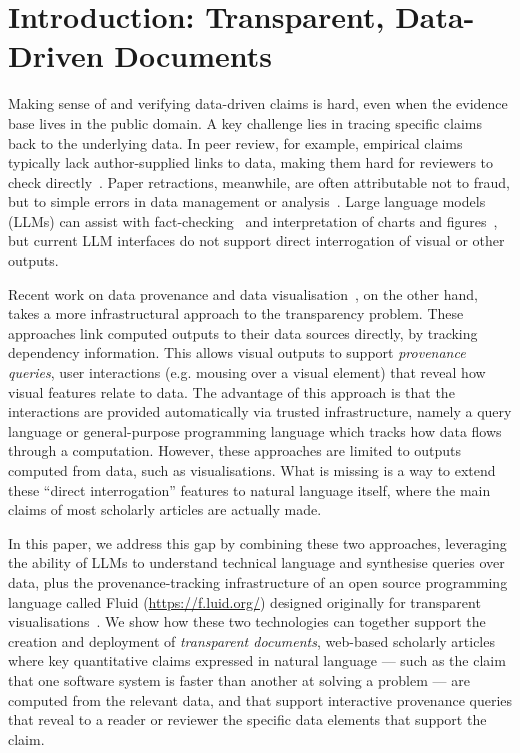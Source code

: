 \section{Introduction: Transparent, Data-Driven Documents}

Making sense of and verifying data-driven claims is hard, even when the evidence base lives in the public
domain. A key challenge lies in tracing specific claims back to the underlying data. In peer review, for
example, empirical claims typically lack author-supplied links to data, making them hard for reviewers to
check directly~\citep{weber20}. Paper retractions, meanwhile, are often attributable not to fraud, but to
simple errors in data management or analysis~\citep{hu25}. Large language models (LLMs) can assist with
fact-checking~\citep{abu-ahmad25} and interpretation of charts and figures~\citep{roberts24}, but current LLM
interfaces do not support direct interrogation of visual or other outputs.

Recent work on data provenance and data visualisation~\citep{psallidas18smoke,bond25}, on the other hand,
takes a more infrastructural approach to the transparency problem. These approaches link computed outputs to
their data sources directly, by tracking dependency information. This allows visual outputs to support
\emph{provenance queries}, user interactions (e.g. mousing over a visual element) that reveal how visual
features relate to data. The advantage of this approach is that the interactions are provided automatically
via trusted infrastructure, namely a query language or general-purpose programming language which tracks how
data flows through a computation. However, these approaches are limited to outputs computed from data, such as
visualisations. What is missing is a way to extend these ``direct interrogation'' features to natural language
itself, where the main claims of most scholarly articles are actually made.

In this paper, we address this gap by combining these two approaches, leveraging the ability of LLMs to
understand technical language and synthesise queries over data, plus the provenance-tracking infrastructure of
an open source programming language called Fluid (\url{https://f.luid.org/}) designed originally for
transparent visualisations~\citep{perera22,bond25}. We show how these two technologies can together support
the creation and deployment of \emph{transparent documents}, web-based scholarly articles where key
quantitative claims expressed in natural language --- such as the claim that one software system is faster
than another at solving a problem --- are computed from the relevant data, and that support interactive
provenance queries that reveal to a reader or reviewer the specific data elements that support the claim.

